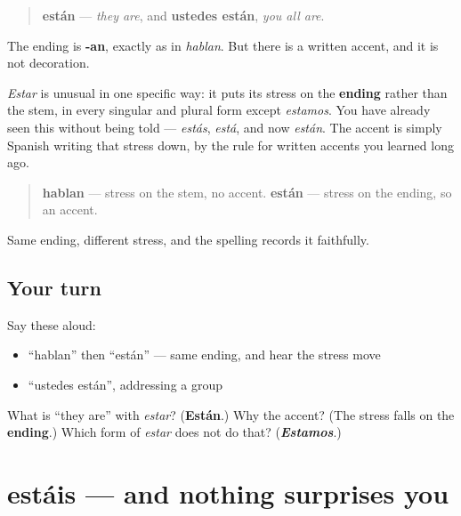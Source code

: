 \begin{grammarlens}[title={Grammar Lens: the ending is regular, the accent is the clue}]
\begin{quote}
\textbf{están} — \emph{they are}, and \textbf{ustedes están}, \emph{you all are}.
\end{quote}

The ending is \textbf{-an}, exactly as in \emph{hablan}. But there is a written accent, and it is not decoration.

\emph{Estar} is unusual in one specific way: it puts its stress on the \textbf{ending} rather than the stem, in every singular and plural form except \emph{estamos}. You have already seen this without being told — \emph{estás}, \emph{está}, and now \emph{están}. The accent is simply Spanish writing that stress down, by the rule for written accents you learned long ago.

\begin{quote}
\textbf{hablan} — stress on the stem, no accent. \textbf{están} — stress on the ending, so an accent.
\end{quote}

Same ending, different stress, and the spelling records it faithfully.
\end{grammarlens}

\subsection*{Your turn}
Say these aloud:

\begin{itemize}
\raggedright
  \item \textquotedblleft{}hablan\textquotedblright{} then \textquotedblleft{}están\textquotedblright{} — same ending, and hear the stress move
  \item \textquotedblleft{}ustedes están\textquotedblright{}, addressing a group
\end{itemize}

\begin{tcolorbox}[breakable,colback=teal!4,colframe=teal!35!black,title={Before you move on}]
What is \textquotedblleft{}they are\textquotedblright{} with \emph{estar}? (\textbf{Están}.) Why the accent? (The stress falls on the \textbf{ending}.) Which form of \emph{estar} does not do that? (\emph{\textbf{Estamos}}.)
\end{tcolorbox}
\section[estáis]{estáis — and nothing surprises you}

